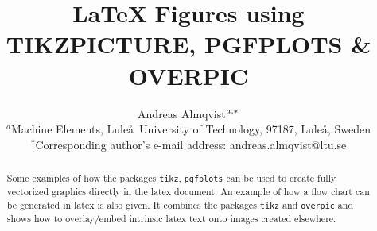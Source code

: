 \documentclass[10pt,a4paper]{article}
\begin{document}
	\title{\LaTeX \,\,Figures using\\ TIKZPICTURE, PGFPLOTS \& OVERPIC}
	\author{
		{\small Andreas Almqvist}$^{a,\ast}\text{\small}$\\
		{$^{a}${\small Machine Elements, Lule\aa \ University of Technology, 97187, Lule\aa , Sweden}}\\
		{$^{\ast}${\small Corresponding author's e-mail address: andreas.almqvist@ltu.se}}
	}
	\date{}
	\maketitle
	\begin{abstract}
	Some examples of how the packages \texttt{tikz}, \texttt{pgfplots} can be used to create fully vectorized graphics directly in the latex document. An example of how a flow chart can be generated in latex is also given. It combines the packages \texttt{tikz} and \texttt{overpic} and shows how to overlay/embed intrinsic latex text onto images created elsewhere.
	\end{abstract}
	\vspace{0.5cm}\noindent
\end{document}
